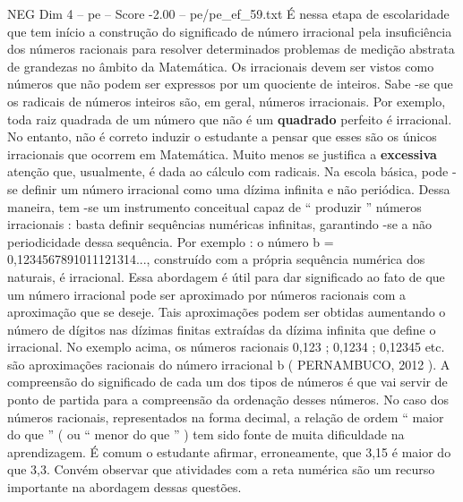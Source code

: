 \begin{textsample}{NEG Dim 4 – pe – Score -2.00 – pe/pe\_ef\_59.txt}
É nessa etapa de escolaridade que tem início a construção do significado de número irracional pela insuficiência dos números racionais para resolver determinados problemas de medição abstrata de grandezas no âmbito da Matemática.
Os irracionais devem ser vistos como números que não podem ser expressos por um quociente de inteiros.
Sabe -se que os radicais de números inteiros são, em geral, números irracionais.
Por exemplo, toda raiz quadrada de um número que não é um \textbf{quadrado} perfeito é irracional.
No entanto, não é correto induzir o estudante a pensar que esses são os únicos irracionais que ocorrem em Matemática.
Muito menos se justifica a \textbf{excessiva} atenção que, usualmente, é dada ao cálculo com radicais.
Na escola básica, pode -se definir um número irracional como uma dízima infinita e não periódica.
Dessa maneira, tem -se um instrumento conceitual capaz de “ produzir ” números irracionais : basta definir sequências numéricas infinitas, garantindo -se a não periodicidade dessa sequência.
Por exemplo : o número b = 0,1234567891011121314..., construído com a própria sequência numérica dos naturais, é irracional.
Essa abordagem é útil para dar significado ao fato de que um número irracional pode ser aproximado por números racionais com a aproximação que se deseje.
Tais aproximações podem ser obtidas aumentando o número de dígitos nas dízimas finitas extraídas da dízima infinita que define o irracional.
No exemplo acima, os números racionais 0,123 ; 0,1234 ; 0,12345 etc. são aproximações racionais do número irracional b ( PERNAMBUCO, 2012 ).
A compreensão do significado de cada um dos tipos de números é que vai servir de ponto de partida para a compreensão da ordenação desses números.
No caso dos números racionais, representados na forma decimal, a relação de ordem “ maior do que ” ( ou “ menor do que ” ) tem sido fonte de muita dificuldade na aprendizagem.
É comum o estudante afirmar, erroneamente, que 3,15 é maior do que 3,3.
Convém observar que atividades com a reta numérica são um recurso importante na abordagem dessas questões.

\end{textsample}

